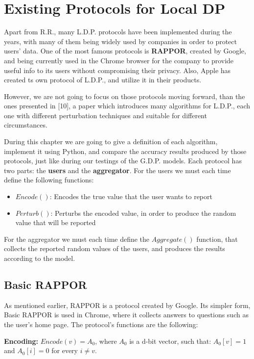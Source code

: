 

\section{Existing Protocols for Local DP}

Apart from R.R., many L.D.P. protocols have been implemented during the years, with many of them being widely used by companies in order to protect users' data. One of the most famous protocols is \textbf{RAPPOR}, created by Google, and being currently used in the Chrome browser for the company to provide useful info to its users without compromising their privacy. Also, Apple has created ts own protocol of L.D.P., and utilize it in their products. 

However, we are not going to focus on those protocols moving forward, than the ones presented in [10], a paper which introduces many algorithms for L.D.P., each one with different perturbation techniques and suitable for different circumstances.

During this chapter we are going to give a definition of each algorithm, implement it using Python, and compare the accuracy results produced by those protocols, just like during our testings of the G.D.P. models. Each protocol has two parts: the \textbf{users} and the \textbf{aggregator}. For the users we must each time define the following functions:

\begin{itemize}
    \item $Encode()$: Encodes the true value that the user wants to report
    \item $Perturb()$: Perturbs the encoded value, in order to produce the random value that will be reported
\end{itemize}

For the aggregator we must each time define the  $Aggregate()$ function, that collects the reported random values of the users, and produces the results according to the model.

\subsection{Basic RAPPOR}
As mentioned earlier, RAPPOR is a protocol created by Google. Its simpler form, Basic RAPPOR is used in Chrome, where it collects answers to questions such as the user's home page. The protocol's functions are the following:

\textbf{Encoding:} $Encode(v) = A_0$, where $A_0$ is a d-bit vector, such that: $A_0[v] = 1$ and $A_0[i] = 0$ for every $i \neq v$. 

